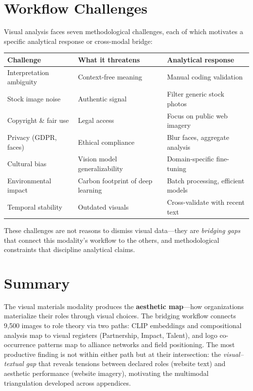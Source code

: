 \documentclass[../main.tex]{subfiles}
\begin{document}
\section{Workflow Challenges}
\label{sec:visual-challenges}

Visual analysis faces seven methodological challenges,
each of which motivates a specific analytical response or cross-modal bridge:

\tableminimal
\begin{center}
\begin{tabular}{@{}p{3cm}p{4cm}p{4cm}@{}}
\toprule
\textbf{Challenge} & \textbf{What it threatens} & \textbf{Analytical response} \\
\midrule
Interpretation ambiguity & Context-free meaning & Manual coding validation \\
Stock image noise & Authentic signal & Filter generic stock photos \\
Copyright \& fair use & Legal access & Focus on public web imagery \\
Privacy (GDPR, faces) & Ethical compliance & Blur faces, aggregate analysis \\
Cultural bias & Vision model generalizability & Domain-specific fine-tuning \\
Environmental impact & Carbon footprint of deep learning & Batch processing, efficient models \\
Temporal stability & Outdated visuals & Cross-validate with recent text \\
\bottomrule
\end{tabular}
\end{center}

These challenges are not reasons to dismiss visual data---they are
\emph{bridging gaps} that connect this modality's workflow to the others,
and methodological constraints that discipline analytical claims.


\section{Summary}

\begin{summarybox}
The visual materials modality produces the \textbf{aesthetic map}---how
organizations materialize their roles through visual choices.
The bridging workflow connects 9,500 images to role theory
via two paths: CLIP embeddings and compositional analysis map to
visual registers (Partnership, Impact, Talent), and logo co-occurrence
patterns map to alliance networks and field positioning.
The most productive finding is not within either path but at
their intersection: the \emph{visual--textual gap} that reveals
tensions between declared roles (website text) and aesthetic performance
(website imagery), motivating the multimodal triangulation developed
across appendices.
\end{summarybox}

\clearpage
{}
\end{document}
